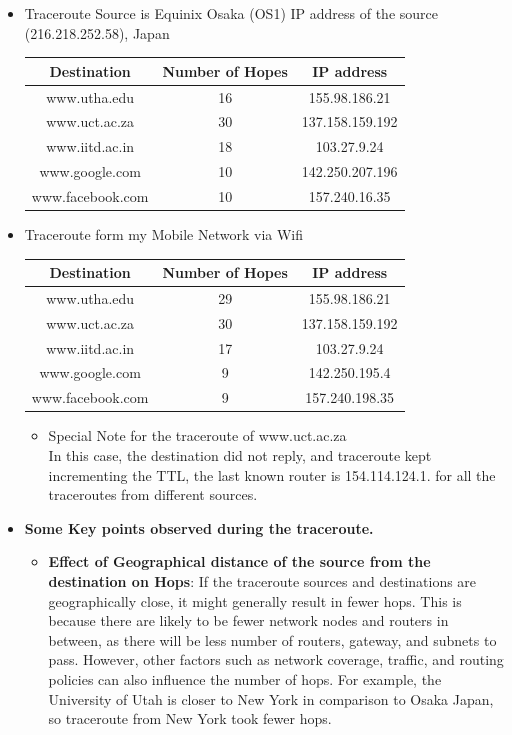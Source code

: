 \documentclass{article}
\begin{document}
\begin{itemize}
\begin{itemize}
   \item Traceroute Source is Equinix Osaka (OS1) IP address of the  source (216.218.252.58), Japan 
   \begin{center}
\begin{tabular}{|c|c|c|}
    \hline
     Destination & Number of Hopes & IP address   \\
    \hline
    www.utha.edu & 16 &   155.98.186.21 \\
    \hline
    www.uct.ac.za & 30 &  137.158.159.192  \\
    \hline
    www.iitd.ac.in & 18 & 103.27.9.24 \\
    \hline 
    www.google.com  &   10  & 142.250.207.196  \\ 
    \hline
    www.facebook.com &  10  & 157.240.16.35 \\  
    \hline
\end{tabular} 
\end{center}
\item Traceroute form my Mobile Network via Wifi \\
        \begin{center}
\begin{tabular}{|c|c|c|}
    \hline
     Destination & Number of Hopes & IP address \\
    \hline
    www.utha.edu & 29 &   155.98.186.21 \\
    \hline
    www.uct.ac.za & 30 &  137.158.159.192 \\
    \hline
    www.iitd.ac.in & 17 & 103.27.9.24 \\
    \hline 
    www.google.com  &   9  & 142.250.195.4  \\ 
    \hline
    www.facebook.com &  9  & 157.240.198.35\\  
    \hline
\end{tabular} 
\end{center}
\begin{itemize}
    \item Special Note for the traceroute of www.uct.ac.za \\
 In this case, the destination did not reply, and traceroute kept incrementing the TTL, the last known router is  154.114.124.1. for all the traceroutes from different sources.
\end{itemize}
\item \textbf{Some Key points observed during the traceroute.}
    \begin{itemize}
        \item \textbf{Effect of Geographical distance of the source from the destination on Hops}: If the traceroute sources and destinations are geographically close, it might generally result in fewer hops. This is because there are likely to be fewer network nodes and routers in between, as there will be less number of routers, gateway, and subnets to pass. However, other factors such as network coverage, traffic, and routing policies can also influence the number of hops. For example, the University of Utah is closer to New York in comparison to Osaka Japan, so traceroute from New York took fewer hops. 

\end{itemize}
\end{itemize}
\end{itemize}
\end{document}
